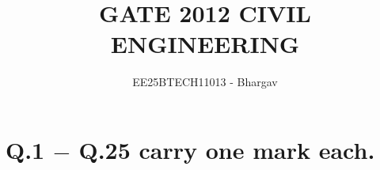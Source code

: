 \documentclass[journal]{IEEEtran}
\begin{document}




\title{GATE 2012 CIVIL ENGINEERING}
\author{EE25BTECH11013 - Bhargav}
\maketitle
{\let\newpage\relax\maketitle}

\renewcommand{\thefigure}{\theenumi}
\renewcommand{\thetable}{\theenumi}
\setlength{\intextsep}{10pt} %


\section*{Q.1 $-$ Q.25 carry one mark each.}
\end{document}
